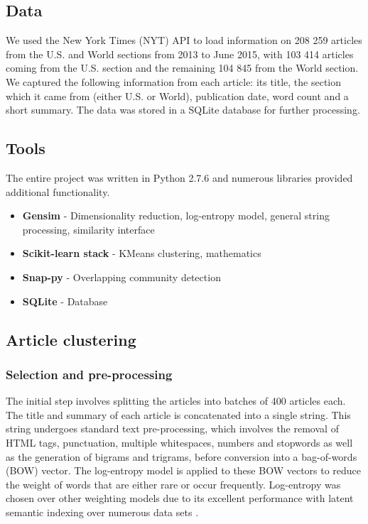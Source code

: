 \documentclass[12pt]{article}
\begin{document}
\subsection{Data}
We used the New York Times (NYT) API to load information on 208 259 articles from the U.S. and World sections from 2013 to June 2015, with 103 414 articles coming from the U.S. section and the remaining 104 845 from the World section. We captured the following information from each article: its title, the section which it came from (either U.S. or World), publication date, word count and a short summary. The data was stored in a SQLite database for further processing.

\subsection{Tools}
The entire project was written in Python 2.7.6 and numerous libraries provided additional functionality.

\begin{itemize}[noitemsep]
\item \textbf{Gensim} - Dimensionality reduction, log-entropy model, general string processing, similarity interface
\item \textbf{Scikit-learn stack} - KMeans clustering, mathematics
\item \textbf{Snap-py} - Overlapping community detection
\item \textbf{SQLite} - Database
\end{itemize}

\subsection{Article clustering} \label{articlecluster}
\subsubsection{Selection and pre-processing} \label{selection}
The initial step involves splitting the articles into batches of 400 articles each. The title and summary of each article is concatenated into a single string. This string undergoes standard text pre-processing, which involves the removal of HTML tags, punctuation, multiple whitespaces, numbers and stopwords as well as the generation of bigrams and trigrams, before conversion into a bag-of-words (BOW) vector. The log-entropy model is applied to these BOW vectors to reduce the weight of words that are either rare or occur frequently. Log-entropy was chosen over other weighting models due to its excellent performance with latent semantic indexing over numerous data sets \cite{lsihb}.
\end{document}

